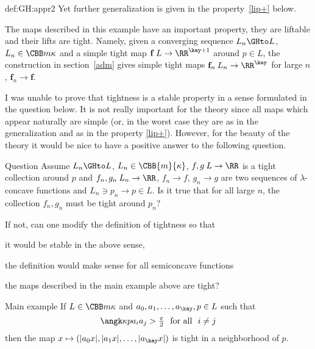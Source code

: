 {\begin{subthm}{def:GH:appr2}
Yet further generalization is given in the property~\ref{lip+} below.

The maps described in this example have an important property, they are liftable
and their lifts are tight. 
Namely, given a converging sequence $L_n\GHto L$, $L_n\in\CBB m\kappa$ and a
simple tight map $\mathbf{f}\:L\to \RR^{\kay+1}$ around $p\in L$, the construction in
section~\ref{adm} gives simple tight maps $\mathbf{f}_n\:L_n\to \RR^\kay$ for large $n$, $\mathbf{f}_n\to \mathbf{f}$.

I was unable to prove that tightness is a stable property in a sense
formulated in the question below.
It is not really important for the theory since all maps which appear naturally 
are simple (or, in the worst case they are as in the generalization and
as in the property \ref{lip+}).
However, for the beauty of the theory it would be nice to have a positive answer to
the following question.

\begin{thm}{Question} Assume $L_n\GHto L$, $L_n\in\CBB{m}{\kappa}$,
$f,g\:L\to \RR$ is a tight collection around $p$ and $f_n,g_n\:L_n\to\RR$, $f_n\to
f$, $g_n\to g$ are two sequences of $\lambda$-concave
functions and $L_n\ni p_n\to p\in L$. 
Is it true that for all large $n$, the collection $f_n,g_n$ must be
tight around $p_n$?

If not, can one modify the definition of tightness so that
\begin{subthm}{}
it would be stable in the above sense,
\end{subthm}

\begin{subthm}{} the definition would make sense for all semiconcave functions
\end{subthm}

\begin{subthm}{} the maps described in the main example above are tight?\end{subthm}
\end{thm}










\begin{thm}{Main example} If $L\in\CBB m\kappa$ and
$a_0,a_1,\dots,a_\kay,p\in L$ such that 
$$\angk\kappa p{a_i}{a_j}>\tfrac\pi2\ \ \text{for all}\ \  i\not=j$$ 
then the map
$x\mapsto (|a_0x|,|a_1x|,\dots,|a_\kay x|)$ is tight in a neighborhood of
$p$.
\end{thm}















\end{subthm}}
